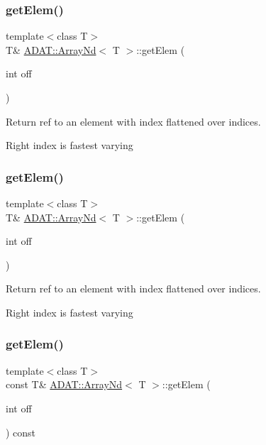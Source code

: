 \subsubsection{\texorpdfstring{getElem()}{getElem()}\hspace{0.1cm}{\footnotesize\ttfamily [2/6]}}
{\footnotesize\ttfamily template$<$class T$>$ \\
T\& \mbox{\hyperlink{classADAT_1_1ArrayNd}{A\+D\+A\+T\+::\+Array\+Nd}}$<$ T $>$\+::get\+Elem (\begin{DoxyParamCaption}\item[{int}]{off }\end{DoxyParamCaption})\hspace{0.3cm}{\ttfamily [inline]}}



Return ref to an element with index flattened over indices. 

Right index is fastest varying \mbox{\label{classADAT_1_1ArrayNd_abc5c56420a9625b236d4521acb083de2}} 
\subsubsection{\texorpdfstring{getElem()}{getElem()}\hspace{0.1cm}{\footnotesize\ttfamily [3/6]}}
{\footnotesize\ttfamily template$<$class T$>$ \\
T\& \mbox{\hyperlink{classADAT_1_1ArrayNd}{A\+D\+A\+T\+::\+Array\+Nd}}$<$ T $>$\+::get\+Elem (\begin{DoxyParamCaption}\item[{int}]{off }\end{DoxyParamCaption})\hspace{0.3cm}{\ttfamily [inline]}}



Return ref to an element with index flattened over indices. 

Right index is fastest varying \mbox{\label{classADAT_1_1ArrayNd_a515368f71387996ee237309eb1f0cc2e}} 
\subsubsection{\texorpdfstring{getElem()}{getElem()}\hspace{0.1cm}{\footnotesize\ttfamily [4/6]}}
{\footnotesize\ttfamily template$<$class T$>$ \\
const T\& \mbox{\hyperlink{classADAT_1_1ArrayNd}{A\+D\+A\+T\+::\+Array\+Nd}}$<$ T $>$\+::get\+Elem (\begin{DoxyParamCaption}\item[{int}]{off }\end{DoxyParamCaption}) const\hspace{0.3cm}{\ttfamily [inline]}}



